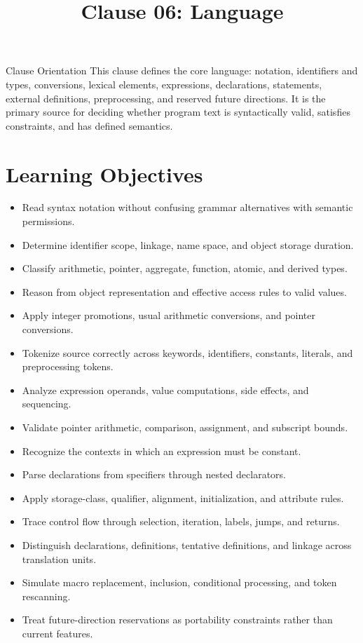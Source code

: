 \documentclass[10pt,letterpaper]{article}
\title{Clause 06: Language}
\author{}
\date{}
\begin{document}
\maketitle



\begin{CornellOverviewBox}{Clause Orientation}
This clause defines the core language: notation, identifiers and types, conversions, lexical elements, expressions, declarations, statements, external definitions, preprocessing, and reserved future directions. It is the primary source for deciding whether program text is syntactically valid, satisfies constraints, and has defined semantics.
\end{CornellOverviewBox}

\section{Learning Objectives}
\begin{itemize}
  \item Read syntax notation without confusing grammar alternatives with semantic permissions.
  \item Determine identifier scope, linkage, name space, and object storage duration.
  \item Classify arithmetic, pointer, aggregate, function, atomic, and derived types.
  \item Reason from object representation and effective access rules to valid values.
  \item Apply integer promotions, usual arithmetic conversions, and pointer conversions.
  \item Tokenize source correctly across keywords, identifiers, constants, literals, and preprocessing tokens.
  \item Analyze expression operands, value computations, side effects, and sequencing.
  \item Validate pointer arithmetic, comparison, assignment, and subscript bounds.
  \item Recognize the contexts in which an expression must be constant.
  \item Parse declarations from specifiers through nested declarators.
  \item Apply storage-class, qualifier, alignment, initialization, and attribute rules.
  \item Trace control flow through selection, iteration, labels, jumps, and returns.
  \item Distinguish declarations, definitions, tentative definitions, and linkage across translation units.
  \item Simulate macro replacement, inclusion, conditional processing, and token rescanning.
  \item Treat future-direction reservations as portability constraints rather than current features.
\end{itemize}
\end{document}
